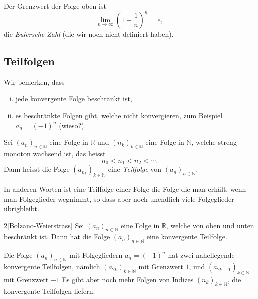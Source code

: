 \documentclass[../main.tex]{subfiles}
\begin{document}
\begin{remark}
  Der Grenzwert der Folge oben ist
  \[
    \lim_{n \to \infty} \left( 1 + \frac{1}{n} \right)^n = e,
  \]
  die \textit{Eulersche Zahl} (die wir noch nicht definiert haben).
\end{remark}

\subsection*{Teilfolgen}
Wir bemerken, dass
\begin{enumerate}[(i)]
  \item jede konvergente Folge beschränkt ist,
  \item es beschränkte Folgen gibt, welche nicht konvergieren,
    zum Beispiel $a_n = (-1)^n$ (wieso?).
\end{enumerate}

\begin{definition}
  Sei ${(a_n)}_{n \in \mathbb{N}}$ eine Folge in $\mathbb{R}$ 
  und ${(n_k)}_{k \in \mathbb{N}}$ eine Folge in $\mathbb{N}$,
  welche streng monoton wachsend ist, das heisst
  \[
    n_0 < n_1 < n_2 < \cdots.
  \]
  Dann heisst die Folge ${(a_{n_k})}_{k \in \mathbb{N}}$ 
eine \textit{Teilfolge} von ${(a_n)}_{n \in \mathbb{N}}$.
\end{definition}

In anderen Worten ist eine Teilfolge einer Folge
die Folge die man erhält, wenn man Folgeglieder
wegnimmt, so dass aber noch unendlich viele
Folgeglieder übrigbleibt.

\begin{manualtheorem}{2}[Bolzano-Weierstrass]
  Sei ${(a_n)}_{n \in \mathbb{N}}$ eine Folge in $\mathbb{R}$,
  welche von oben und unten beschränkt ist.
  Dann hat die Folge ${(a_n)}_{n \in \mathbb{N}}$
  eine konvergente Teilfolge.
\end{manualtheorem}

\begin{example}
  Die Folge ${(a_n)}_{n \in \mathbb{N}}$ mit Folgegliedern
  $a_n = (-1)^n$ hat zwei naheliegende konvergente Teilfolgen,
  nämlich ${(a_{2k})}_{k \in \mathbb{N}}$ mit Grenzwert $1$,
  und ${(a_{2k+1})}_{k \in \mathbb{N}}$ mit Grenzwert $-1$ 
  Es gibt aber noch mehr Folgen von Indizes 
  $(n_k)_{k \in \mathbb{N}}$, die
  konvergente Teilfolgen liefern.
\end{example}
\end{document}
